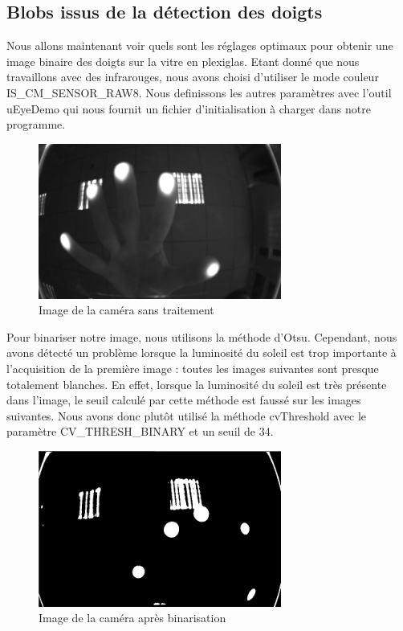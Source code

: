 \subsection{Blobs issus de la détection des doigts}

Nous allons maintenant voir quels sont les réglages optimaux pour obtenir une image binaire des doigts sur 
la vitre en plexiglas. Etant donné que nous travaillons avec des infrarouges, nous avons choisi d'utiliser
le mode couleur IS\_CM\_SENSOR\_RAW8. Nous definissons les autres paramètres avec l'outil uEyeDemo qui nous
fournit un fichier d'initialisation à charger dans notre programme.\\

\begin{figure}[H]
      \center
      \includegraphics[width=8cm]{ressources/tp5/1-camera_regle_sans_traitement.png}
      \caption{Image de la caméra sans traitement}
\end{figure}

Pour binariser notre image, nous utilisons la méthode d'Otsu. Cependant, nous avons détecté un problème lorsque 
la luminosité du soleil est trop importante à l'acquisition de la première image : toutes les images suivantes sont 
presque totalement blanches. En effet, lorsque la luminosité du soleil est très présente dans l'image, le seuil calculé par
cette méthode est faussé sur les images suivantes. Nous avons donc plutôt utilisé la méthode cvThreshold avec
le paramètre CV\_THRESH\_BINARY et un seuil de 34.\\

\begin{figure}[H]
      \center
      \includegraphics[width=8cm]{ressources/tp5/2-flux_binarise.png}
      \caption{Image de la caméra après binarisation}
\end{figure}

